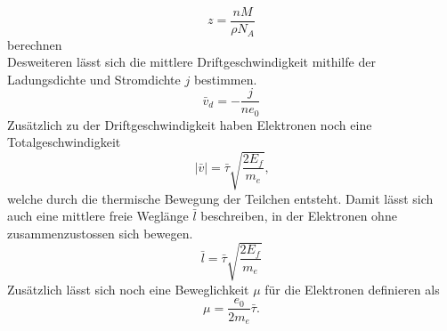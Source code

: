 \begin{equation}
    z=\frac{nM}{\rho N_A}
    \label{ladung_pro_atom}
\end{equation}
\noindent berechnen\\
\noindent Desweiteren lässt sich die mittlere Driftgeschwindigkeit mithilfe der Ladungsdichte und Stromdichte $j$ bestimmen.
\begin{equation}
    \bar{v}_d=-\frac{j}{ne_0}
    \label{eqn:drift}
\end{equation}
Zusätzlich zu der Driftgeschwindigkeit haben Elektronen noch eine Totalgeschwindigkeit
\begin{equation}
    |\bar{v}|=\bar{\tau}\sqrt{\frac{2E_f}{m_e}}\text{,} 
    \label{eqn:total}
\end{equation}
\noindent welche durch die thermische Bewegung der Teilchen entsteht. Damit lässt sich auch eine mittlere freie Weglänge $\bar{l}$
beschreiben, in der Elektronen ohne zusammenzustossen sich bewegen.
\begin{equation}
    \bar{l}=\bar{\tau}\sqrt{\frac{2E_f}{m_e}}
    \label{eqn:Weglänge}
\end{equation}
\noindent Zusätzlich lässt sich noch eine Beweglichkeit $\mu$ für die Elektronen definieren als
\begin{equation}
    \mu=\frac{e_0}{2m_e}\bar{\tau}\text{.}
    \label{eqn:Beweglichkeit}
\end{equation}


